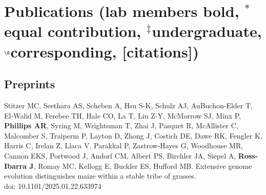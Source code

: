 \documentclass[letterpaper,10pt]{article}
\renewenvironment{itemize}{
  \begin{list}{}{
    \setlength{\leftmargin}{1.5em}
  }
}{
  \end{list}
}
\begin{document}
\begin{itemize}

\end{itemize}

\newpage
\section*{Publications {\small(lab members bold, $^*$equal contribution, $^\ddagger$undergraduate, $^\S$corresponding, [citations])}}


\subsection*{Preprints}
\begin{itemize}
  \setlength\itemsep{0ex}

  \item Stitzer MC, Seethara AS, Scheben A, Hsu S-K, Schulz AJ, AuBuchon-Elder T,   El-Walid M, Ferebee TH, Hale CO,  La T,  Liu Z-Y,  McMorrow SJ,  Minx P, \textbf{Phillips AR},  Syring M,  Wrightsman T,  Zhai J,  Pasquet R,  McAllister C,  Malcomber S,  Traiperm P,  Layton D,  Zhong J,  Costich DE, Dawe RK,  Fengler K,  Harris C,  Irelan Z,  Llaca V,  Parakkal P,  Zastrow-Hayes G,  Woodhouse MR,  Cannon EKS,  Portwood J,  Andorf CM,  Albert PS, Birchler JA,  Siepel A, \textbf{Ross-Ibarra J}, Romay MC,  Kellogg E,  Buckler ES, Hufford MB.  Extensive genome evolution distinguishes maize within a stable tribe of grasses. \\ doi: 10.1101/2025.01.22.633974  

\end{itemize}
\end{document}

